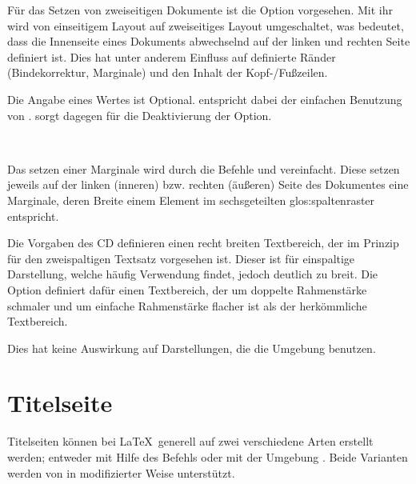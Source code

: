 \begin{Declaration}
\end{Declaration}

Für das Setzen von zweiseitigen Dokumente ist die Option 
vorgesehen. Mit ihr wird von einseitigem Layout auf zweiseitiges Layout
umgeschaltet, was bedeutet, dass die Innenseite eines Dokuments abwechselnd
auf der linken und rechten Seite definiert ist. Dies hat unter anderem Einfluss
auf definierte Ränder (Bindekorrektur, Marginale) und den Inhalt der
Kopf-/Fußzeilen.

Die Angabe eines Wertes ist Optional.  entspricht
dabei der einfachen Benutzung von .
 sorgt dagegen für die Deaktivierung der Option.

\begin{Declaration}
  \\
\end{Declaration}

Das setzen einer Marginale wird durch die Befehle  und
 vereinfacht. Diese setzen jeweils auf der linken (inneren)
bzw. rechten (äußeren) Seite des Dokumentes eine Marginale, deren Breite
einem Element im sechsgeteilten \gls{glos:spaltenraster} entspricht.

\begin{Declaration}
\end{Declaration}

Die Vorgaben des CD definieren einen recht breiten Textbereich, der im Prinzip
für den zweispaltigen Textsatz vorgesehen ist. Dieser ist für einspaltige
Darstellung, welche häufig Verwendung findet, jedoch deutlich zu breit.
Die Option  definiert dafür einen Textbereich, der um
doppelte Rahmenstärke schmaler und um einfache Rahmenstärke flacher
ist als der herkömmliche Textbereich.
\begin{important}
Dies hat keine Auswirkung auf Darstellungen, die die Umgebung
 benutzen.
\end{important}


\section{Titelseite}\label{sec:titlepage}

Titelseiten können bei \LaTeX\ generell auf zwei verschiedene Arten erstellt
werden; entweder mit Hilfe des Befehls  oder mit
der Umgebung . Beide Varianten werden von \tubslatex
in modifizierter Weise unterstützt.

